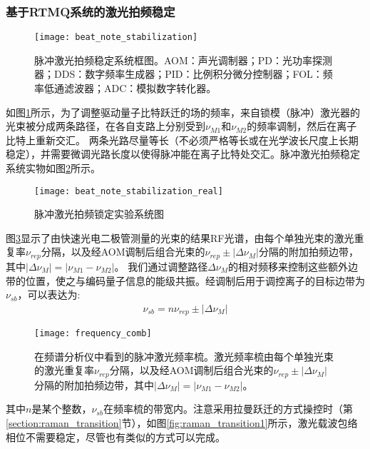 \subsubsection[基于RTMQ系统的激光拍频稳定]{基于RTMQ系统的激光拍频稳定}

\begin{figure}
    \centering
    \caption[脉冲激光拍频稳定系统框图]{脉冲激光拍频稳定系统框图。AOM：声光调制器；PD：光功率探测器；DDS：数字频率生成器；PID：比例积分微分控制器；FOL：频率低通滤波器；ADC：模拟数字转化器。\label{fig:beat_note_stabilization}}
    \texttt{[image: beat\_note\_stabilization]}
\end{figure}

如图\ref{fig:beat_note_stabilization}所示，为了调整驱动量子比特跃迁的场的频率，来自锁模（脉冲）激光器的光束被分成两条路径，在各自支路上分别受到$\nu_{M1}$和$\nu_{M2}$的频率调制，然后在离子比特上重新交汇。
两条光路尽量等长（不必须严格等长或在光学波长尺度上长期稳定），并需要微调光路长度以使得脉冲能在离子比特处交汇。脉冲激光拍频稳定系统实物如图\ref{fig:beat_note_stabilization_real}所示。

\begin{figure}
    \centering
    \caption[脉冲激光拍频锁定实验系统图]{脉冲激光拍频锁定实验系统图\label{fig:beat_note_stabilization_real}}
    \texttt{[image: beat\_note\_stabilization\_real]}
\end{figure}

图\ref{fig:frequency_comb}显示了由快速光电二极管测量的光束的结果RF光谱，由每个单独光束的激光重复率$\nu_{rep}$分隔，以及经AOM调制后组合光束的$\nu_{rep}\pm |\Delta \nu_M|$分隔的附加拍频边带，其中$|\Delta \nu_M|=|\nu_{M1}-\nu_{M2}|$。
我们通过调整路径$\Delta\nu_M$的相对频移来控制这些额外边带的位置，使之与编码量子信息的能级共振。经调制后用于调控离子的目标边带为$\nu_{sb}$，可以表达为:
\begin{align}
    \nu_{sb}=n\nu_{rep}\pm|\Delta\nu_M|
\end{align}

\begin{figure}
    \centering
    \caption[脉冲激光频率梳]{在频谱分析仪中看到的脉冲激光频率梳。激光频率梳由每个单独光束的激光重复率$\nu_{rep}$分隔，以及经AOM调制后组合光束的$\nu_{rep}\pm |\Delta \nu_M|$分隔的附加拍频边带，其中$|\Delta \nu_M|=|\nu_{M1}-\nu_{M2}|$。\label{fig:frequency_comb}}
    \texttt{[image: frequency\_comb]}
\end{figure}

其中$n$是某个整数，$\nu_{sb}$在频率梳的带宽内。注意采用拉曼跃迁的方式操控时（第\ref{section:raman_transition}节），如图\ref{fig:raman_transition1}所示，激光载波包络相位不需要稳定\cite[]{Peer_Shapiro_Stowe_Shapiro_Ye_2007}，尽管也有类似的方式可以完成\cite[]{Koke_Grebing_Frei_Anderson_Assion_Steinmeyer_2010}。

